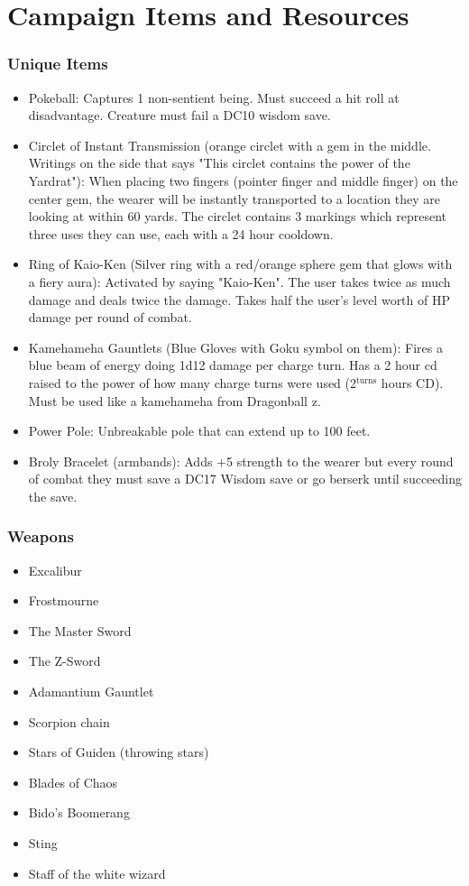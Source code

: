 \chapter{Campaign Items and Resources} \label{resources}



\subsection{Unique Items}

\begin{itemize}
	\item Pokeball: Captures 1 non-sentient being. Must succeed a hit roll at disadvantage. Creature must fail a DC10 wisdom save.
	\item Circlet of Instant Transmission (orange circlet with a gem in the middle. Writings on the side that says "This circlet contains the power of the Yardrat"): When placing two fingers (pointer finger and middle finger) on the center gem, the wearer will be instantly transported to a location they are looking at within 60 yards. The circlet contains 3 markings which represent three uses they can use, each with a 24 hour cooldown.
	\item Ring of Kaio-Ken (Silver ring with a red/orange sphere gem that glows with a fiery aura): Activated by saying "Kaio-Ken". The user takes twice as much damage and deals twice the damage. Takes half the user's level worth of HP damage per round of combat.
	\item Kamehameha Gauntlets (Blue Gloves with Goku symbol on them): Fires a blue beam of energy doing 1d12 damage per charge turn. Has a 2 hour cd raised to the power of how many charge turns were used (2$^\textrm{turns}$ hours CD). Must be used like a kamehameha from Dragonball z.
	\item Power Pole: Unbreakable pole that can extend up to 100 feet.
	\item Broly Bracelet (armbands): Adds +5 strength to the wearer but every round of combat they must save a DC17 Wisdom save or go berserk until succeeding the save. 
\end{itemize}

\subsection{Weapons}

\begin{itemize}
	\item Excalibur
	\item Frostmourne
	\item The Master Sword
	\item The Z-Sword
	\item Adamantium Gauntlet
	\item Scorpion chain
	\item Stars of Guiden (throwing stars)
	\item Blades of Chaos
	\item Bido's Boomerang
	\item Sting
	\item Staff of the white wizard
\end{itemize}

